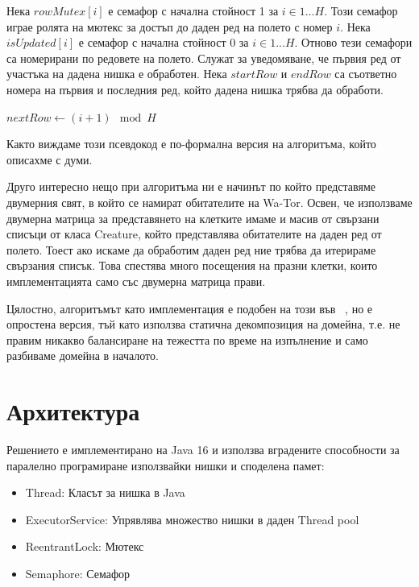 \documentclass[12pt]{article}
\begin{document}
Нека $rowMutex[i]$ е семафор с начална стойност 1 за $i \in 1...H$.
Този семафор играе ролята на мютекс за достъп до даден ред на полето с номер $i$.
Нека $isUpdated[i]$ е семафор с начална стойност 0 за $i \in 1...H$.
Отново тези семафори са номерирани по редовете на полето. Служат за уведомяване,
че първия ред от участъка на дадена нишка е обработен.
Нека $startRow$ и $endRow$ са съответно номера на първия и последния ред,
който дадена нишка трябва да обработи.
\medbreak
\begin{algorithmic}
	\State $nextRow\gets (i + 1) \mod H$
		\State {}
		\State {}
		\State {}
	\EndIf

	\State {}

		\State {}
		\State {}
		\State {}
	\EndIf
\EndFor
\end{algorithmic}
\medbreak
Както виждаме този псевдокод е по-формална версия на алгоритъма, който описахме с думи.

Друго интересно нещо при алгоритъма ни е начинът по който представяме двумерния свят, в който се намират
обитателите на Wa-Tor. Освен, че използваме двумерна матрица за представянето на клетките
имаме и масив от свързани списъци от класа Creature, който представлява обитателите на даден
ред от полето. Тоест ако искаме да обработим даден ред ние трябва да итерираме свързания списък.
Това спестява много посещения на празни клетки, които имплементацията само със двумерна матрица прави.

Цялостно, алгоритъмът като имплементация е подобен на този във ~\cite{bounded_neighbours}, но е опростена
версия, тъй като използва статична декомпозиция на домейна, т.е. не правим никакво балансиране на тежестта
по време на изпълнение и само разбиваме домейна в началото.

\newpage

\section{Архитектура}
Решението е имплементирано на Java 16 и използва вградените способности за паралелно програмиране
използвайки нишки и споделена памет:
\begin{itemize}
	\item Thread: Класът за нишка в Java
	\item ExecutorService: Упрявлява множество нишки в даден Thread pool
	\item ReentrantLock: Мютекс
	\item Semaphore: Семафор
\end{itemize}
\end{document}
